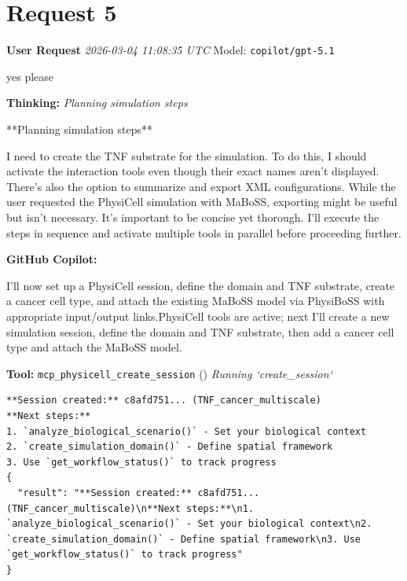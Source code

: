 \documentclass[11pt,a4paper]{article}
\begin{document}
\section{Request 5}
\begin{userbox}
\textbf{User Request}
\quad \textit{2026-03-04 11:08:35 UTC}
\quad Model: \texttt{copilot/gpt-5.1}

yes please

\end{userbox}
\begin{thinkbox}
\textbf{Thinking:} \textit{Planning simulation steps}

**Planning simulation steps**

I need to create the TNF substrate for the simulation. To do this, I should activate the interaction tools even though their exact names aren’t displayed. There's also the option to summarize and export XML configurations. While the user requested the PhysiCell simulation with MaBoSS, exporting might be useful but isn't necessary. It’s important to be concise yet thorough. I’ll execute the steps in sequence and activate multiple tools in parallel before proceeding further.

\end{thinkbox}
\begin{copilotbox}
\textbf{GitHub Copilot:}

I'll now set up a PhysiCell session, define the domain and TNF substrate, create a cancer cell type, and attach the existing MaBoSS model via PhysiBoSS with appropriate input/output links.PhysiCell tools are active; next I’ll create a new simulation session, define the domain and TNF substrate, then add a cancer cell type and attach the MaBoSS model.

\end{copilotbox}
\begin{toolokbox}
\textbf{Tool:} \texttt{mcp\_physicell\_create\_session} (\checkmark)
\textit{Running `create\_session`}
\begin{lstlisting}
**Session created:** c8afd751... (TNF_cancer_multiscale)
**Next steps:**
1. `analyze_biological_scenario()` - Set your biological context
2. `create_simulation_domain()` - Define spatial framework
3. Use `get_workflow_status()` to track progress
{
  "result": "**Session created:** c8afd751... (TNF_cancer_multiscale)\n**Next steps:**\n1. `analyze_biological_scenario()` - Set your biological context\n2. `create_simulation_domain()` - Define spatial framework\n3. Use `get_workflow_status()` to track progress"
}
\end{lstlisting}
\end{toolokbox}
\end{document}
